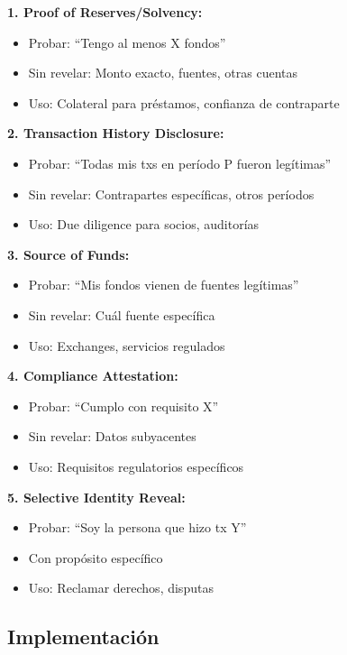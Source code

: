 \documentclass[11pt,a4paper,twoside]{book}
\theoremstyle{definition}
\theoremstyle{remark}
\begin{document}
\begin{mathnote}
\textbf{1. Proof of Reserves/Solvency:}
\begin{itemize}
    \item Probar: ``Tengo al menos X fondos''
    \item Sin revelar: Monto exacto, fuentes, otras cuentas
    \item Uso: Colateral para préstamos, confianza de contraparte
\end{itemize}

\textbf{2. Transaction History Disclosure:}
\begin{itemize}
    \item Probar: ``Todas mis txs en período P fueron legítimas''
    \item Sin revelar: Contrapartes específicas, otros períodos
    \item Uso: Due diligence para socios, auditorías
\end{itemize}

\textbf{3. Source of Funds:}
\begin{itemize}
    \item Probar: ``Mis fondos vienen de fuentes legítimas''
    \item Sin revelar: Cuál fuente específica
    \item Uso: Exchanges, servicios regulados
\end{itemize}

\textbf{4. Compliance Attestation:}
\begin{itemize}
    \item Probar: ``Cumplo con requisito X''
    \item Sin revelar: Datos subyacentes
    \item Uso: Requisitos regulatorios específicos
\end{itemize}

\textbf{5. Selective Identity Reveal:}
\begin{itemize}
    \item Probar: ``Soy la persona que hizo tx Y''
    \item Con propósito específico
    \item Uso: Reclamar derechos, disputas
\end{itemize}
\end{mathnote}

\subsection{Implementación}
\end{document}
